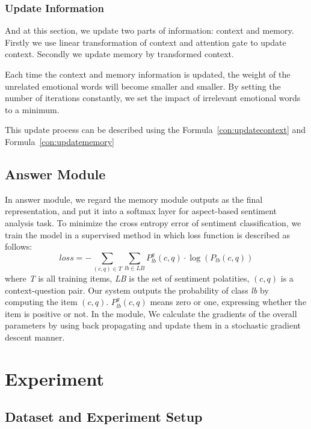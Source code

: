 \documentclass[runningheads, twocolumn]{llncs}
\begin{document}
\subsubsection{Update Information}
And at this section, we update two parts of information: context and memory. Firstly we use linear transformation of context and attention gate to update context. Secondly we update memory by transformed context. 

Each time the context and memory information is updated, the weight of the unrelated emotional words will become smaller and smaller. By setting the number of iterations constantly, we set the impact of irrelevant emotional words to a minimum.

This update process can be described using the Formula~\ref{con:updatecontext} and Formula~\ref{con:updatememory}

\subsection{Answer Module}
In answer module, we regard the memory module outputs as the final representation, and put it into a softmax layer for aspect-based sentiment analysis task. To minimize the cross entropy error of sentiment classification, we train the model in a supervised method in which loss function is described as follows:
\begin{equation}
	loss = -\sum_{\left(c, q\right)\in T}\sum_{lb\in LB}P_{lb}^g\left(c, q\right)\cdot \log\left(P_{lb}\left(c, q\right)\right)
\end{equation}
where \emph{T} is all training items, \emph{LB} is the set of sentiment polatities, $\left(c, q\right)$ is a context-question pair. Our system outputs the probability of class \emph{lb} by computing the item $\left(c, q\right)$. $P_{lb}^g\left(c, q\right)$ means zero or one, expressing whether the item is positive or not. In the module, We calculate the gradients of the overall parameters by using back propagating and update them in a stochastic gradient descent manner.

\section{Experiment}

\subsection{Dataset and Experiment Setup}
\end{document}
